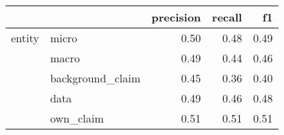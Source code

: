 \begin{tabular}{llrrr}
\toprule
       &           &  precision &  recall &   f1 \\
\midrule
entity & micro &       0.50 &    0.48 & 0.49 \\
       & macro &       0.49 &    0.44 & 0.46 \\
       & background\_claim &       0.45 &    0.36 & 0.40 \\
       & data &       0.49 &    0.46 & 0.48 \\
       & own\_claim &       0.51 &    0.51 & 0.51 \\
\bottomrule
\end{tabular}
